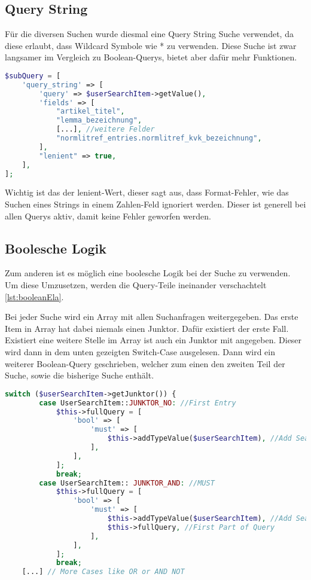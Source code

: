\subsection{Query String}
Für die diversen Suchen wurde diesmal eine Query String Suche verwendet, da diese erlaubt, dass Wildcard Symbole wie * zu verwenden. Diese Suche ist zwar langsamer im Vergleich zu Boolean-Querys, bietet aber dafür mehr Funktionen.

\begin{lstlisting}[language=PHP, frame=single, label={lst:aufbauQueryString}] 
$subQuery = [
    'query_string' => [
        'query' => $userSearchItem->getValue(),
        'fields' => [
            "artikel_titel",
            "lemma_bezeichnung",
            [...], //weitere Felder
            "normlitref_entries.normlitref_kvk_bezeichnung",
        ],
        "lenient" => true,
    ],
];
\end{lstlisting}

Wichtig ist das der lenient-Wert, dieser sagt aus, dass Format-Fehler, wie das Suchen eines Strings in einem Zahlen-Feld ignoriert werden. Dieser ist generell bei allen Querys aktiv, damit keine Fehler geworfen werden.


\subsection{Boolesche Logik}

Zum anderen ist es möglich eine boolesche Logik bei der Suche zu verwenden. Um diese Umzusetzen, werden die Query-Teile ineinander verschachtelt \ref{lst:booleanEla}. 

Bei jeder Suche wird ein Array mit allen Suchanfragen weitergegeben. Das erste Item in Array hat dabei niemals einen Junktor. Dafür existiert der erste Fall. Existiert eine weitere Stelle im Array ist auch ein Junktor mit angegeben. Dieser wird dann in dem unten gezeigten Switch-Case ausgelesen. Dann wird ein weiterer Boolean-Query geschrieben, welcher zum einen den zweiten Teil der Suche, sowie die bisherige Suche enthält.

\begin{lstlisting}[language=PHP, frame=single, label={lst:booleanEla}] 
    switch ($userSearchItem->getJunktor()) {
        case UserSearchItem::JUNKTOR_NO: //First Entry
            $this->fullQuery = [
                'bool' => [
                    'must' => [
                        $this->addTypeValue($userSearchItem), //Add Search
                    ],
                ],
            ];
            break;
        case UserSearchItem:: JUNKTOR_AND: //MUST
            $this->fullQuery = [
                'bool' => [
                    'must' => [
                        $this->addTypeValue($userSearchItem), //Add Search
                        $this->fullQuery, //First Part of Query
                    ],
                ],
            ];
            break;
    [...] // More Cases like OR or AND NOT
\end{lstlisting}

